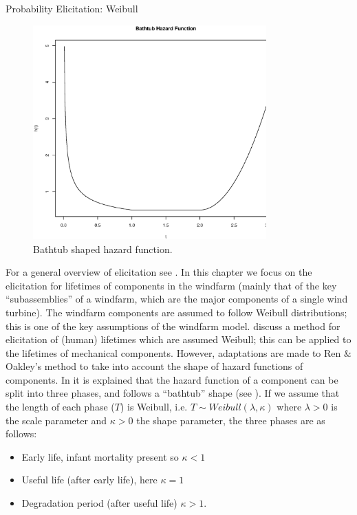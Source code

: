 \begin{chapter}{Probability Elicitation: Weibull \label{Chap:elic-weib}}
\begin{figure}
	\centering
	\includegraphics[width = 0.8\textwidth]{fig-elic/bathtub-hazard.eps}
	\caption{Bathtub shaped hazard function.}
	\label{Fig:bathtub}
\end{figure}
For a general overview of elicitation see \citep{Garthwaite05, Ohagan06}. In this chapter we focus on the elicitation for lifetimes of components in the windfarm (mainly that of the key ``subassemblies'' of a windfarm, which are the major components of a single wind turbine). The windfarm components are assumed to follow Weibull distributions; this is one of the key assumptions of the windfarm model. \cite{Ren13} discuss a method for elicitation of (human) lifetimes which are assumed Weibull; this can be applied to the lifetimes of mechanical components. However, adaptations are made to Ren $\&$ Oakley's method to take into account the shape of hazard functions of components. In \cite{Wang02} it is explained that the hazard function of a component can be split into three phases, and follows a ``bathtub'' shape (see ). If we assume that the length of each phase ($T$) is Weibull, i.e. $T \sim Weibull(\lambda, \kappa)$ where $\lambda > 0$ is the scale parameter and $\kappa > 0$ the shape parameter, the three phases are as follows:
\begin{itemize}
	\item Early life, infant mortality present so $\kappa <1$
	\item Useful life (after early life), here $\kappa = 1$
	\item Degradation period (after useful life) $\kappa > 1$.
\end{itemize}

\end{chapter}
